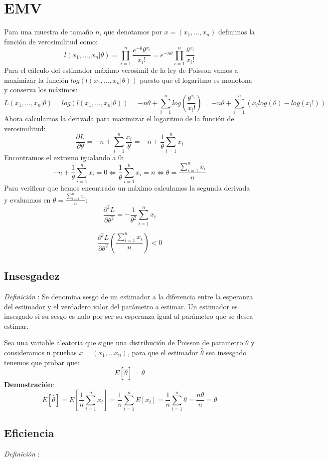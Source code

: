 \documentclass[a4paper, 10pt]{article} %
\newcounter{def}
\begin{document}
\section{EMV}
Para una muestra de tamaño $n$, que denotamos por $x=(x_1,...,x_n)$ definimos la función de verosimilitud como:
$$l(x_1,...,x_n|\theta)=\prod_{i=1}^{n} \frac{e^{-\theta}\theta^{x_i}}{x_i!}=e^{-n\theta}\prod_{i=1}^{n} \frac{\theta^{x_i}}{x_i!}$$
Para el cálculo del estimador máximo verosimil de la ley de Poisson vamos a maximizar la función $log(l(x_1,...,x_n|\theta))$ puesto que el logaritmo es monotona y conserva los máximos:
$$L(x_1,...,x_n|\theta)=log(l(x_1,...,x_n|\theta))=-n\theta + \sum_{i=1}^{n}log(\frac{\theta^{x_i}}{x_i!})=-n\theta+ \sum_{i=1}^{n}(x_i log(\theta)-log(x_i!))$$
Ahora calculamos la derivada para maximizar el logaritmo de la función de verosimilitud:
$$\frac{\partial L}{\partial \theta}=-n+\sum_{i=1}^{n}\frac{x_i}{\theta}=-n+\frac{1}{\theta}\sum_{i=1}^{n}x_i$$
Encontramos el extremo igualando a 0:
$$-n+\frac{1}{\theta}\sum_{i=1}^{n}x_i=0 \Leftrightarrow \frac{1}{\theta}\sum_{i=1}^{n}x_i=n \Leftrightarrow \theta =\frac{\sum_{i=1}^{n}x_i}{n}$$
Para verificar que hemos encontrado un máximo calculamos la segunda derivada y evaluamos en $\theta =\frac{\sum_{i=1}^{n}x_i}{n}$:
$$\frac{\partial^2 L}{\partial \theta^2}=-\frac{1}{\theta^2}\sum_{i=1}^{n}x_i$$

$$\frac{\partial^2 L}{\partial \theta^2}(\frac{\sum_{i=1}^{n}x_i}{n})<0$$
\subsection{Insesgadez}
\addtocounter{def}{1}
\emph{Definición }: Se denomina sesgo de un estimador a la diferencia entre la esperanza del estimador y el verdadero valor del parámetro a estimar. Un estimador es insesgado si su sesgo es nulo por ser su esperanza igual al parámetro que se desea estimar.

Sea una variable aleatoria que sigue una distribución de Poisson de parametro $\theta$ y consideramos n pruebas $x=(x_1,...x_n)$, para que el estimador $\hat{\theta}$ sea insesgado tenemos que probar que:
$$E[\hat{\theta}]=\theta$$
\textbf{Demostración}:
$$E[\hat{\theta}]=E[\frac{1}{n}\sum_{i=1}^{n}x_i]=\frac{1}{n}\sum_{i=1}^{n}E[x_i]=\frac{1}{n}\sum_{i=1}^{n}\theta=\frac{n\theta}{n}=\theta$$
\subsection{Eficiencia}
\addtocounter{def}{1}
\emph{Definición }:
\end{document}
